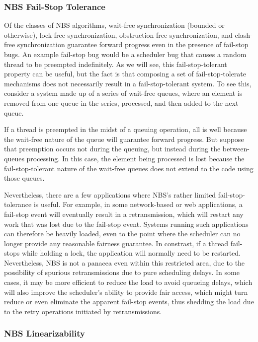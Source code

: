 \subsubsection{NBS Fail-Stop Tolerance}
\label{sec:advsync:NBS Fail-Stop Tolerance}

Of the classes of NBS algorithms, wait-free synchronization (bounded or
otherwise), lock-free synchronization, obstruction-free synchronization,
and clash-free synchronization guarantee forward progress even in the
presence of fail-stop bugs.
An example fail-stop bug would be a scheduler bug that causes a random
thread to be preempted indefinitely.
As we will see, this fail-stop-tolerant property can be useful, but the
fact is that composing a set of fail-stop-tolerate mechanisms does not
necessarily result in a fail-stop-tolerant system.
To see this, consider a system made up of a series of wait-free queues,
where an element is removed from one queue in the series, processed,
and then added to the next queue.

If a thread is preempted in the midst of a queuing operation, all is well
because the wait-free nature of the queue will guarantee forward progress.
But suppose that preemption occurs not during the queuing, but instead
during the between-queues processing.
In this case, the element being processed is lost because
the fail-stop-tolerant nature of the wait-free queues does not
extend to the code using those queues.

Nevertheless, there are a few applications where NBS's rather limited
fail-stop-tolerance is useful.
For example, in some network-based or web applications, a fail-stop
event will eventually result in a retransmission, which will restart
any work that was lost due to the fail-stop event.
Systems running such applications can therefore be heavily loaded, even
to the point where the scheduler can no longer provide any reasonable
fairness guarantee.
In constrast, if a thread fail-stops while holding a lock, the application
will normally need to be restarted.
Nevertheless, NBS is not a panacea even within this restricted area,
due to the possibility of spurious retransmissions due to pure scheduling
delays.
In some cases, it may be more efficient to reduce the load to avoid
queueing delays, which will also improve the scheduler's ability to
provide fair access, which might turn reduce or even eliminate the
apparent fail-stop events, thus shedding the load due to the retry
operations initiated by retransmissions.

\subsubsection{NBS Linearizability}
\label{sec:advsync:NBS Linearizability}

